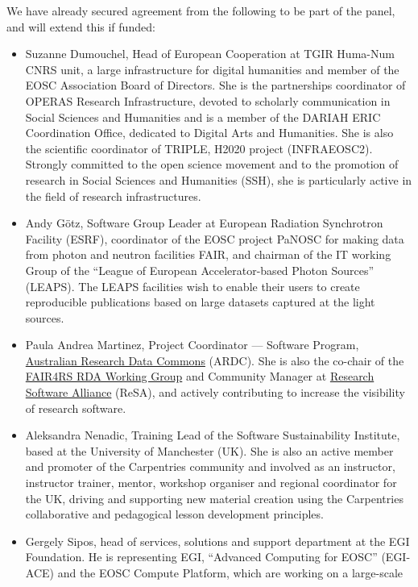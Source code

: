 We have already secured agreement from the following to be part of the panel,
and will extend this if funded:
\begin{itemize}
\item Suzanne Dumouchel, Head of European Cooperation at TGIR Huma-Num CNRS unit, a large infrastructure for
digital humanities and member of the EOSC Association Board of Directors. She is the partnerships coordinator
of OPERAS Research Infrastructure, devoted to scholarly communication in Social
Sciences and Humanities and is a member of the DARIAH ERIC Coordination Office,
dedicated to Digital Arts and Humanities. She is also the scientific coordinator of TRIPLE, H2020 project
(INFRAEOSC2). Strongly committed to the open science movement and to the promotion of research in Social Sciences
and Humanities (SSH), she is particularly active in the field of research infrastructures.
\item Andy Götz, Software Group Leader at European Radiation Synchrotron
  Facility (ESRF), coordinator of the EOSC project PaNOSC for making data from
  photon and neutron facilities FAIR, and chairman of the IT working Group of
  the ``League of European Accelerator-based Photon Sources'' (LEAPS). The LEAPS
  facilities wish to enable their users to create reproducible publications
  based on large datasets captured at the light sources.
\item Paula Andrea Martinez, Project Coordinator --- Software Program, \href{https://ardc.edu.au/}{Australian Research Data Commons} (ARDC).
She is also the co-chair of the \href{https://www.rd-alliance.org/groups/fair-research-software-fair4rs-wg}{FAIR4RS RDA Working Group} and
Community Manager at \href{https://www.researchsoft.org/}{Research Software Alliance} (ReSA), and actively contributing
to increase the visibility of research software.
\item Aleksandra Nenadic, Training Lead of the Software Sustainability Institute,
based at the University of Manchester (UK). She is also an active member and
promoter of the Carpentries community and involved as an instructor,
instructor trainer, mentor, workshop organiser and regional coordinator
for the UK, driving and supporting new material creation using the
Carpentries collaborative and pedagogical lesson development principles.
\item Gergely Sipos, head of services, solutions and support department at the
  EGI Foundation. He is representing EGI, ``Advanced Computing for EOSC''
  (EGI-ACE) and the EOSC Compute Platform, which are working on a large-scale

\end{itemize}
